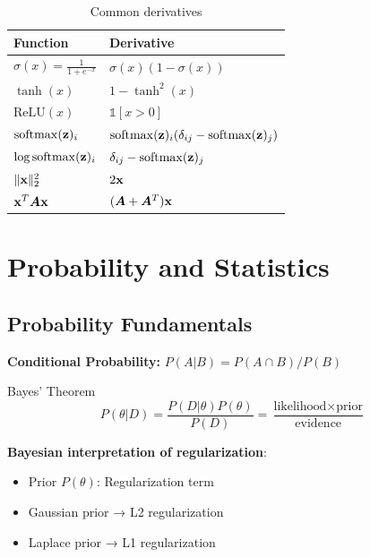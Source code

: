 \begin{table}[H]
\centering
\caption{Common derivatives}
\begin{tabular}{ll}
\toprule
\textbf{Function} & \textbf{Derivative} \\
\midrule
$\sigma(x) = \frac{1}{1+e^{-x}}$ & $\sigma(x)(1-\sigma(x))$ \\
$\tanh(x)$ & $1 - \tanh^2(x)$ \\
$\text{ReLU}(x)$ & $\mathds{1}[x > 0]$ \\
$\operatorname{softmax}(\mathbf{z})_i$ & $\operatorname{softmax}(\mathbf{z})_i(\delta_{ij} - \operatorname{softmax}(\mathbf{z})_j)$ \\
$\log\operatorname{softmax}(\mathbf{z})_i$ & $\delta_{ij} - \operatorname{softmax}(\mathbf{z})_j$ \\
$\|\mathbf{x}\|_2^2$ & $2\mathbf{x}$ \\
$\mathbf{x}^T \bm{A} \mathbf{x}$ & $(\bm{A} + \bm{A}^T)\mathbf{x}$ \\
\bottomrule
\end{tabular}
\end{table}

\section{Probability and Statistics}
\label{sec:probability}

\subsection{Probability Fundamentals}

\textbf{Conditional Probability:} $P(A|B) = P(A \cap B) / P(B)$

\begin{mathresult}{Bayes' Theorem}
\begin{equation}
P(\theta | D) = \frac{P(D | \theta) P(\theta)}{P(D)} = \frac{\text{likelihood} \times \text{prior}}{\text{evidence}}
\end{equation}
\end{mathresult}

\textbf{Bayesian interpretation of regularization}:
\begin{itemize}
    \item Prior $P(\theta)$: Regularization term
    \item Gaussian prior → L2 regularization
    \item Laplace prior → L1 regularization
\end{itemize}

